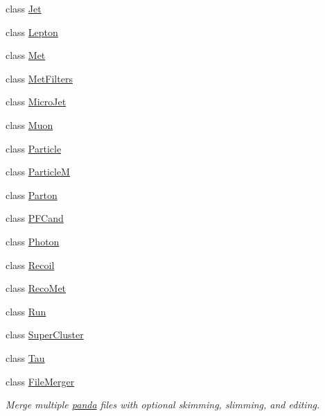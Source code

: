 \begin{DoxyCompactItemize}
\item 
class \hyperlink{classpanda_1_1Jet}{Jet}
\item 
class \hyperlink{classpanda_1_1Lepton}{Lepton}
\item 
class \hyperlink{classpanda_1_1Met}{Met}
\item 
class \hyperlink{classpanda_1_1MetFilters}{MetFilters}
\item 
class \hyperlink{classpanda_1_1MicroJet}{MicroJet}
\item 
class \hyperlink{classpanda_1_1Muon}{Muon}
\item 
class \hyperlink{classpanda_1_1Particle}{Particle}
\item 
class \hyperlink{classpanda_1_1ParticleM}{ParticleM}
\item 
class \hyperlink{classpanda_1_1Parton}{Parton}
\item 
class \hyperlink{classpanda_1_1PFCand}{PFCand}
\item 
class \hyperlink{classpanda_1_1Photon}{Photon}
\item 
class \hyperlink{classpanda_1_1Recoil}{Recoil}
\item 
class \hyperlink{classpanda_1_1RecoMet}{RecoMet}
\item 
class \hyperlink{classpanda_1_1Run}{Run}
\item 
class \hyperlink{classpanda_1_1SuperCluster}{SuperCluster}
\item 
class \hyperlink{classpanda_1_1Tau}{Tau}
\item 
class \hyperlink{classpanda_1_1FileMerger}{FileMerger}
\begin{DoxyCompactList}\small\item\em Merge multiple \hyperlink{namespacepanda}{panda} files with optional skimming, slimming, and editing. \item\end{DoxyCompactList}\end{DoxyCompactItemize}
